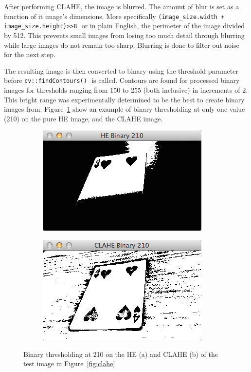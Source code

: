 \documentclass[a4paper,12pt,notitlepage]{article}
\newcommand{\code}[1]{\colorbox{white}{\lstinline[basicstyle=\ttfamily\color{black}]|#1|} }
\begin{document}
			After performing CLAHE, the image is blurred. The amount of blur is set as a function of it image's dimensions. More specifically \code{(image_size.width + image_size.height)>>8} or in plain English, the perimeter of the image divided by 512. This prevents small images from losing too much detail through blurring while large images do not remain too sharp. Blurring is done to filter out noise for the next step.

			The resulting image is then converted to binary using the threshold parameter before \code{cv::findContours()} is called. Contours are found for processed binary images for thresholds ranging from 150 to 255 (both inclusive) in increments of 2. This bright range was experimentally determined to be the best to create binary images from. Figure~\ref{fig:clahebin} show an example of binary thresholding at only one value (210) on the pure HE image, and the CLAHE image.

			\begin{figure}[H]
				\centering
				\begin{subfigure}[b]{0.4\textwidth}
					\centering
					\includegraphics[width=\textwidth]{hebin}
					\caption{}
				\end{subfigure}
				\qquad
				\begin{subfigure}[b]{0.4\textwidth}
					\centering
					\includegraphics[width=\textwidth]{clahebin}
					\caption{}
				\end{subfigure}
				\caption{Binary thresholding at 210 on the HE (a) and CLAHE (b) of the test image in Figure~\ref{fig:clahe}}
				\label{fig:clahebin}
			\end{figure}
\end{document}
